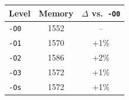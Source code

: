 \begin{tabular*}{\columnwidth}{@{\extracolsep\fill}lcc@{\extracolsep\fill}}
\toprule
\textbf{Level} & \textbf{Memory} & \textbf{$\Delta$ vs.\ \texttt{-O0}} \\
\midrule
\texttt{-O0} & 1552 & -- \\
\texttt{-O1} & 1570 & +1\% \\
\texttt{-O2} & 1586 & +2\% \\
\texttt{-O3} & 1572 & +1\% \\
\texttt{-Os} & 1572 & +1\% \\
\bottomrule
\end{tabular*}
